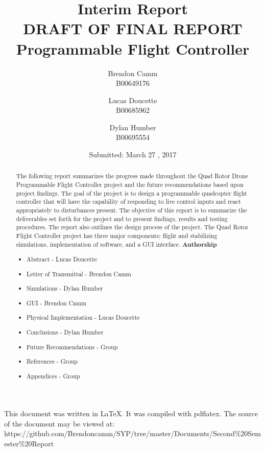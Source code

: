 \documentclass[12pt,letterpaper,titlepage]{article}
\title{Interim Report \\ \small DRAFT OF FINAL REPORT \\ Programmable Flight Controller}
\author{Brendon Camm \\ B00649176 \and Lucas Doucette \\ B00685962 \and Dylan Humber \\ B00695554}
\date{Submitted: March 27 , 2017}
\begin{document}
	\maketitle
	\newpage
	\vspace*{2in}
	This document was written in \LaTeX.  It was compiled with pdflatex.  The source of the document may be viewed at: \newline\small	https://github.com/Brendoncamm/SYP/tree/master/Documents/Second\%20Semester\%20Report
	\vspace*{4in}
	\pagebreak


	\newpage
	\begin{abstract} %
	The following report summarizes the progress made throughout the Quad Rotor Drone Programmable Flight Controller project and the future recommendations based upon project findings. The goal of the project is to design a programmable quadcopter flight controller that will have the capability of responding to live control inputs and react appropriately to disturbances present. The objective of this report is to summarize the deliverables set forth for the project and to present findings, results and testing procedures. The report also outlines the design process of the project. The Quad Rotor Flight Controller project has three major components; flight and stabilizing simulations, implementation of software, and a GUI interface.  	
	\textbf{Authorship}
	\begin{itemize}
		\itemsep-.5em
		\item{Abstract - Lucas Doucette}
		\item{Letter of Transmittal - Brendon Camm}
		\item{Simulations - Dylan Humber}
		\item{GUI - Brendon Camm}
		\item{Physical Implementation - Lucas Doucette}
		\item{Conclusions - Dylan Humber}
		\item{Future Recommendations - Group}
		\item{References - Group}
		\item{Appendices - Group}
	\end{itemize}
	
	\end{abstract}
	\setcounter{tocdepth}{2}
	\setcounter{tocdepth}{3}
	\tableofcontents
	\pagebreak
	
	
\end{document}
